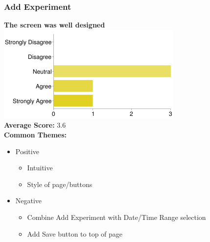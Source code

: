 \subsubsection{Add Experiment}
\textbf{The screen was well designed}\\
\includegraphics[page=1,scale=0.65]{../other/usability-report-charts/create_experiment_bar_chart}\\
\textbf{Average Score:} 3.6\\
\textbf{Common Themes:}
\begin{itemize}
\item Positive
\begin{itemize}
\item Intuitive
\item Style of page/buttons
\end{itemize}
\item Negative
\begin{itemize}
\item Combine Add Experiment with Date/Time Range selection
\item Add Save button to top of page
\end{itemize}
\end{itemize}

